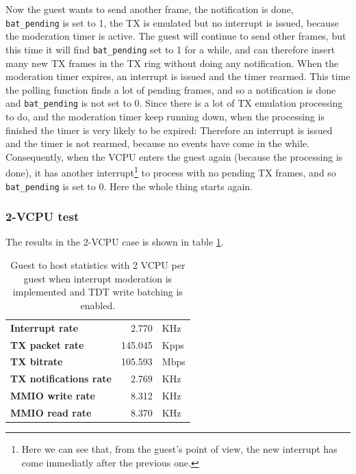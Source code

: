 Now the guest wants to send another frame, the notification is done, \texttt{bat\_pending} is set to 1, the TX is emulated but no
interrupt is issued, because the moderation timer is active. The guest will continue to send other frames, but this time it will
find \texttt{bat\_pending} set to 1 for a while, and can therefore insert many new TX frames in the TX ring without doing any notification.
When the moderation timer expires, an interrupt is issued and the timer rearmed. This time the polling function finds a lot of pending 
frames, and so a notification is done and \texttt{bat\_pending} is not set to 0. Since there is a lot of TX emulation processing to do,
and the moderation timer keep running down, when the processing is finished the timer is very likely to be expired: Therefore an interrupt
is issued and the timer is not rearmed, because no events have come in the while. Consequently, when the VCPU enters the guest again
(because the processing is done), it has another
interrupt\footnote{Here we can see that, from the guest's point of view, the new interrupt has come immediatly after the previous one.} 
to process with no pending TX frames, and so \texttt{bat\_pending} is set to 0. Here the whole thing starts again.


\subsubsection{2-VCPU test}
The results in the 2-VCPU case is shown in table \ref{tab:e1000-mit-bat-tx-g2h2vcpu}.

\begin{table}
\begin{center}
\begin{tabular}{lrl}
\toprule
\textbf{Interrupt rate} & 2.770 & KHz\\
\textbf{TX packet rate} & 145.045 & Kpps\\
\textbf{TX bitrate} & 105.593 & Mbps\\
\textbf{TX notifications rate} & 2.769 & KHz\\
\textbf{MMIO write rate} & 8.312 & KHz\\
\textbf{MMIO read rate} & 8.370 & KHz\\
\bottomrule
\end{tabular}
\end{center}
\caption{Guest to host statistics with 2 VCPU per guest when interrupt moderation is implemented and TDT write batching is enabled.}
\label{tab:e1000-mit-bat-tx-g2h2vcpu}
\end{table}


